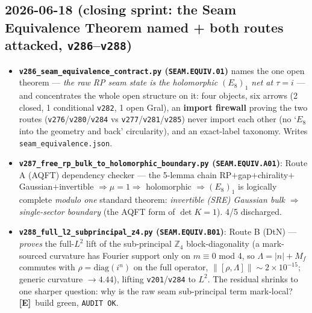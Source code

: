 \documentclass[11pt]{article}
\providecommand{\mE}{\textbf{[E]}}\providecommand{\mC}{\textbf{[C]}}
\providecommand{\vref}[1]{\texttt{#1}}
\begin{document}
\subsection*{2026-06-18 (closing sprint: the Seam Equivalence Theorem named + both routes attacked, \texttt{v286}--\texttt{v288})}
\begin{itemize}
\item \textbf{\texttt{v286\_seam\_equivalence\_contract.py} (\texttt{SEAM.EQUIV.01})} names the one open theorem
  --- \emph{the raw RP seam state is the holomorphic $(E_8)_1$ net at $\tau{=}i$} --- and concentrates the whole
  open structure on it: four objects, six arrows (2 closed, 1 conditional \vref{v282}, 1 open Gral), an
  \textbf{import firewall} proving the two routes (\vref{v276}/\vref{v280}/\vref{v284} vs
  \vref{v277}/\vref{v281}/\vref{v285}) never import each other (no `$E_8$ into the geometry and back'
  circularity), and an exact-label taxonomy. Writes \texttt{seam\_equivalence.json}.
\item \textbf{\texttt{v287\_free\_rp\_bulk\_to\_holomorphic\_boundary.py} (\texttt{SEAM.EQUIV.A01})}: Route A
  (AQFT) dependency checker --- the 5-lemma chain RP$+$gap$+$chirality$+$Gaussian$+$invertible
  $\Rightarrow\mu{=}1\Rightarrow$ holomorphic $\Rightarrow(E_8)_1$ is logically complete \emph{modulo one}
  standard theorem: \emph{invertible (SRE) Gaussian bulk $\Rightarrow$ single-sector boundary} (the AQFT form
  of $\det K{=}1$). 4/5 discharged.
\item \textbf{\texttt{v288\_full\_l2\_subprincipal\_z4.py} (\texttt{SEAM.EQUIV.B01})}: Route B (DtN) ---
  \emph{proves} the full-$L^2$ lift of the sub-principal $\mathbb{Z}_4$ block-diagonality (a mark-sourced
  curvature has Fourier support only on $m\equiv0$ mod 4, so $\Lambda=|n|+M_f$ commutes with
  $\rho=\mathrm{diag}(i^n)$ on the full operator, $\|[\rho,\Lambda]\|\sim2{\times}10^{-15}$; generic curvature
  $\to 4.44$), lifting \vref{v201}/\vref{v284} to $L^2$. The residual shrinks to one sharper question: why is the
  raw seam sub-principal term mark-local? \mE\ build green, \texttt{AUDIT OK}.
\end{itemize}
\end{document}
